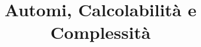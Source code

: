 



\title{Automi, Calcolabilit\`a e Complessit\`a}

\maketitle

\newpage

\tableofcontents
\newpage





\listoftables

\listoffigures


